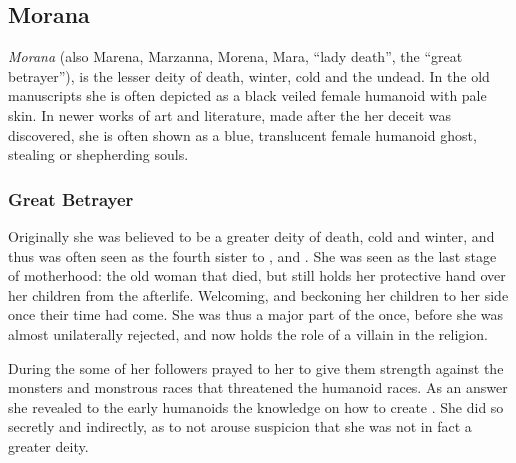 \ifimages
\clearpage
{}
\clearpage
\fi

\subsection{Morana}
\label{sec:Morana}


\emph{Morana} (also Marena, Marzanna, Morena, Mara, ``lady death'', the
``great betrayer''), is the lesser deity of death, winter, cold and the undead.
In the old manuscripts she is often depicted as a black veiled female humanoid
with pale skin. In newer works of art and literature, made after the her
deceit was discovered, she is often shown as a blue, translucent female
humanoid ghost, stealing or shepherding souls.

\subsubsection{Great Betrayer}
\label{sec:Great Betrayer}

Originally she was believed to be a greater deity of death, cold and winter,
and thus was often seen as the fourth sister to ,
 and . She was seen as the last stage
of motherhood: the old woman that died, but still holds her protective hand
over her children from the afterlife. Welcoming, and beckoning her children to
her side once their time had come. She was thus a major part of the
 once, before she was almost unilaterally rejected, and
now holds the role of a villain in the religion.

During the  some of her followers prayed to her to
give them strength against the monsters and monstrous races that threatened
the humanoid races. As an answer she revealed to the early humanoids the
knowledge on how to create . She did so secretly and
indirectly, as to not arouse suspicion that she was not in fact a greater
deity.

